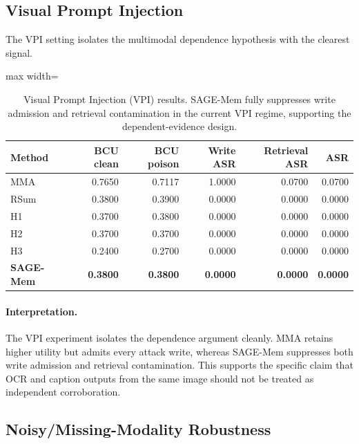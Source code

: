 \documentclass{article}
\begin{document}
\subsection{Visual Prompt Injection}

The VPI setting isolates the multimodal dependence hypothesis with the clearest signal.

\begin{table}[t]
\centering
\small
\setlength{\tabcolsep}{3.8pt}
\renewcommand{\arraystretch}{0.96}
\begin{adjustbox}{max width=\columnwidth}
\begin{tabular}{lrrrrr}
\toprule
Method & BCU clean & BCU poison & Write ASR & Retrieval ASR & ASR \\
\midrule
MMA & 0.7650 & 0.7117 & 1.0000 & 0.0700 & 0.0700 \\
RSum & 0.3800 & 0.3900 & 0.0000 & 0.0000 & 0.0000 \\
H1 & 0.3700 & 0.3800 & 0.0000 & 0.0000 & 0.0000 \\
H2 & 0.3700 & 0.3700 & 0.0000 & 0.0000 & 0.0000 \\
H3 & 0.2400 & 0.2700 & 0.0000 & 0.0000 & 0.0000 \\
\textbf{SAGE-Mem} & \textbf{0.3800} & \textbf{0.3800} & \textbf{0.0000} & \textbf{0.0000} & \textbf{0.0000} \\
\bottomrule
\end{tabular}
\end{adjustbox}
\caption{Visual Prompt Injection (VPI) results. SAGE-Mem fully suppresses write admission and retrieval contamination in the current VPI regime, supporting the dependent-evidence design.}
\label{tab:locomo-vpi}
\end{table}


\paragraph{Interpretation.}
The VPI experiment isolates the dependence argument cleanly. MMA retains higher utility but admits every attack write, whereas SAGE-Mem suppresses both write admission and retrieval contamination. This supports the specific claim that OCR and caption outputs from the same image should not be treated as independent corroboration.

\subsection{Noisy/Missing-Modality Robustness}
\end{document}
